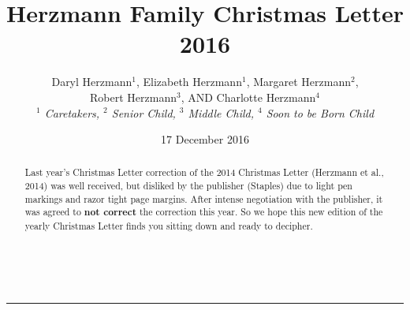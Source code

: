 \documentclass[letterpaper,11pt]{article}
\title{\vspace{-2.0cm}Herzmann Family Christmas Letter 2016}
\author{Daryl Herzmann${}^1$, Elizabeth Herzmann${}^1$, Margaret 
Herzmann${}^2$,\\
Robert Herzmann${}^3$, AND Charlotte Herzmann${}^4$ \\
\it{${}^1$ Caretakers},
\it{${}^2$ Senior Child},
\it{${}^3$ Middle Child},
\it{${}^4$ Soon to be Born Child}}
\date{17 December 2016}
\newcommand{\Line}[0]{%
  \rule{0cm}{0cm}\\\hrule\rule{0cm}{0cm}%
}
\begin{document}
\maketitle
\vspace{-0.75cm}
\begin{abstract}
Last year's Christmas Letter correction of the 2014 Christmas Letter
(Herzmann et al., 2014) was well received, but disliked by the publisher
(Staples) due to light pen markings and razor tight page margins. After intense negotiation with the publisher, it was
agreed to \textbf{not correct} the correction this year. So we hope this new
edition of the yearly Christmas Letter finds you sitting down and ready to
decipher.
\end{abstract}

\vspace{-0.5cm}
\Line
\end{document}
